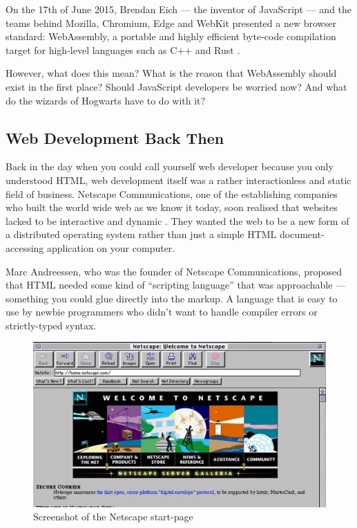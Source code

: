 \documentclass[10pt]{article}
\begin{document}
\begin{sloppypar}
  On the 17th of June 2015, Brendan Eich — the inventor of JavaScript — and the teams behind Mozilla, Chromium, Edge and WebKit presented a new browser standard: WebAssembly, a portable and highly efficient byte-code compilation target for high-level languages such as C++ and Rust \citep{eich_asmjs_2015}.

  However, what does this mean? What is the reason that WebAssembly should exist in the first place? Should JavaScript developers be worried now? And what do the wizards of Hogwarts have to do with it?

  \subsection{Web Development Back Then}
  \label{sec:back-then}

  Back in the day when you could call yourself web developer because you only understood HTML, web development itself was a rather interactionless and static field of business. Netscape Communications, one of the establishing companies who built the world wide web as we know it today, soon realised that websites lacked to be interactive and dynamic \citep{cassel_brendan_2018}. They wanted the web to be a new form of a distributed operating system rather than just a simple HTML document-accessing application on your computer.

  Marc Andreessen, who was the founder of Netscape Communications, proposed that HTML needed some kind of “scripting language” that was approachable — something you could glue directly into the markup. A language that is easy to use by newbie programmers who didn’t want to handle compiler errors or strictly-typed syntax.

  \begin{figure}[ht]
    \centering
    \includegraphics[width=\textwidth]{figures/002.jpg}
    \caption{Screenshot of the Netscape start-page \citep{npr_home_nodate}}
    \label{fig:netscape}
  \end{figure}


\end{sloppypar}
\end{document}
